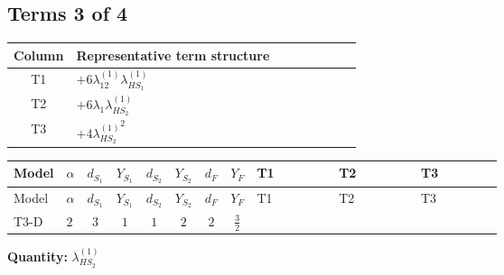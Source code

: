 \documentclass[8pt]{article}
\begin{document}
\begin{landscape}
\subsection*{Terms 3 of 4}
\begin{center}
\begin{tabular}{@{}c >{\raggedright\arraybackslash}p{0.82\linewidth}@{}}
\toprule
Column & Representative term structure \\
\midrule
T1 & \(\displaystyle +6 {\lambda_{12}^{(1)}} {\lambda_{HS_1}^{(1)}}\) \\
\midrule
T2 & \(\displaystyle +6 {\lambda_1} {\lambda_{HS_2}^{(1)}}\) \\
\midrule
T3 & \(\displaystyle +4 {\lambda_{HS_2}^{(1)}}^2\) \\
\midrule
\bottomrule
\end{tabular}
\end{center}
\smallskip
\tiny
\begin{longtable}{@{}llcccccc >{\raggedright\arraybackslash}p{0.21\linewidth} >{\raggedright\arraybackslash}p{0.21\linewidth} >{\raggedright\arraybackslash}p{0.21\linewidth}@{}}
\toprule
Model & $\alpha$ & $d_{S_1}$ & $Y_{S_1}$ & $d_{S_2}$ & $Y_{S_2}$ & $d_F$ & $Y_F$ & T1 & T2 & T3 \\
\midrule
\endfirsthead
\toprule
Model & $\alpha$ & $d_{S_1}$ & $Y_{S_1}$ & $d_{S_2}$ & $Y_{S_2}$ & $d_F$ & $Y_F$ & T1 & T2 & T3 \\
\midrule
\endhead
T3-D & $2$ & $3$ & $1$ & $1$ & $2$ & $2$ & $\frac{3}{2}$ & \scriptsize\adjustbox{max width=\linewidth}{$\begin{gathered} +6 {\lambda_{12}^{(1)}} {\lambda_{HS_1}^{(1)}}\end{gathered}$} & \scriptsize\adjustbox{max width=\linewidth}{$\begin{gathered} +6 {\lambda_1} {\lambda_{HS_2}^{(1)}}\end{gathered}$} & \scriptsize\adjustbox{max width=\linewidth}{$\begin{gathered} +4 {\lambda_{HS_2}^{(1)}}^2\end{gathered}$} \\
\midrule
\bottomrule
\end{longtable}
\clearpage
\noindent\textbf{Quantity: }$\lambda_{HS_2}^{(1)}$\par\smallskip

\end{landscape}
\end{document}
